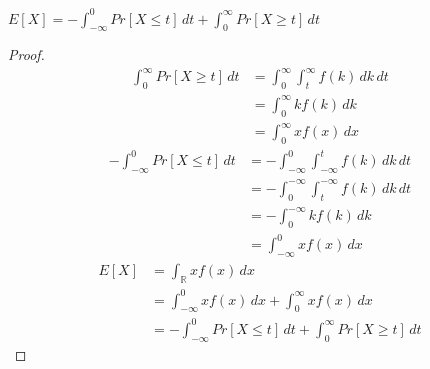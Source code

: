 $E[X]=-\int_{-\infty}^{0}Pr[X\le t]\, dt+\int_{0}^{\infty}Pr[X\ge t]\, dt$
\begin{proof}
\begin{align}
    \nonumber \int_{0}^{\infty}Pr[X\ge t]\, dt &=\int_{0}^{\infty}
    \int_{t}^{\infty}f(k)\, dk
    \, dt\\
    \nonumber&=\int_{0}^{\infty}
    kf(k)
    \, dk\\
    \nonumber&=\int_{0}^{\infty}
    xf(x)
    \, dx
\end{align}
\begin{align}
    \nonumber -\int_{-\infty}^{0}Pr[X\le t]\, dt &=-\int_{-\infty}^{0}
    \int_{-\infty}^{t}f(k)\, dk
    \, dt\\
    \nonumber&=-\int_{0}^{-\infty}
   \int_{t}^{-\infty}f(k)\, dk
    \, dt\\
    \nonumber&=-\int_{0}^{-\infty}
    kf(k)
    \, dk\\
    \nonumber&=\int_{-\infty}^{0}
    xf(x)
    \, dx
\end{align}
\begin{align}
    \nonumber E[X]&=\int_{\mathbb{R}}xf(x)\, dx\\
    \nonumber &=\int_{-\infty}^{0}xf(x)\, dx+\int_{0}^{\infty}xf(x)\, dx\\
    \nonumber &=-\int_{-\infty}^{0}Pr[X\le t]\, dt + \int_{0}^{\infty}Pr[X\ge t]\, dt
\end{align}
\end{proof}